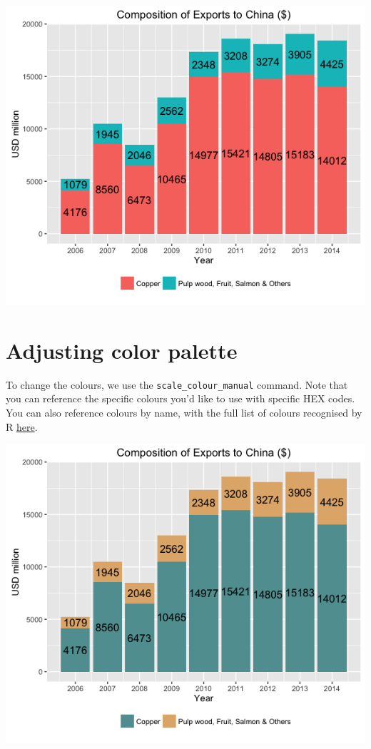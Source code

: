 \begin{center}\includegraphics[width=0.55\linewidth]{0_all_posts_pdf/bar_7-1} \end{center}

\section{Adjusting color palette}\label{adjusting-color-palette-2}

To change the colours, we use the \texttt{scale\_colour\_manual}
command. Note that you can reference the specific colours you'd like to
use with specific HEX codes. You can also reference colours by name,
with the full list of colours recognised by R
\href{http://www.stat.columbia.edu/~tzheng/files/Rcolor.pdf}{here}.

\begin{Shaded}
\begin{Highlighting}[]
\StringTok{ }\NormalTok{(}\NormalTok{, }\NormalTok{)}
\StringTok{ }\StringTok{ }\NormalTok{(}
\end{Highlighting}
\end{Shaded}

\begin{center}\includegraphics[width=0.55\linewidth]{0_all_posts_pdf/bar_8-1} \end{center}

